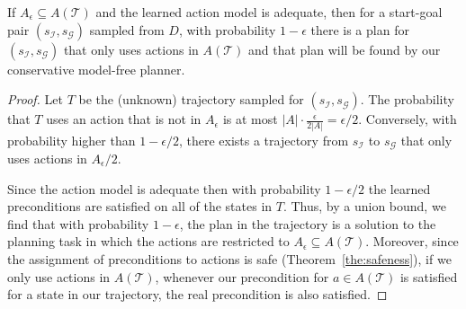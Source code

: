 \begin{lemma}
	If $A_\epsilon\subseteq A(\mathcal{T})$ and the learned action model is adequate, then for a start-goal pair $(s_\mathcal{I},s_\mathcal{G})$ sampled from $D$, with probability $1-\epsilon$ there is a plan for $(s_\mathcal{I},s_\mathcal{G})$ that only uses actions in $A(\mathcal{T})$ and that plan will be found by our conservative model-free planner.
	\label{lem:plan-existance}
\end{lemma}
\begin{proof} 
	Let $T$ be the (unknown) trajectory sampled for $(s_\mathcal{I},s_\mathcal{G})$. 
	The probability that $T$ uses an action that is not in 
	$A_\epsilon$ is at most $|A|\cdot\frac{\epsilon}{2|A|}=\epsilon/2$. 
	Conversely, with probability higher than $1-\epsilon/2$, there exists a trajectory from   $s_\mathcal{I}$ to $s_\mathcal{G}$ that only uses actions in $A_\epsilon/2$. 
	
	Since the action model is adequate then with probability $1-\epsilon/2$ the learned preconditions are satisfied on all of the states in $T$. Thus, by a union bound, we find that with probability $1-\epsilon$, the plan in the trajectory is a solution to the planning task in which the actions are restricted to $A_\epsilon\subseteq A(\mathcal{T})$.
	Moreover, since the assignment of preconditions to actions is safe (Theorem~\ref{the:safeness}), if we only use actions in $A(\mathcal{T})$, whenever our precondition for $a\in A(\mathcal{T})$ is satisfied for a state in our trajectory, the real precondition is also satisfied.
	
	
	
	
	

\end{proof}
